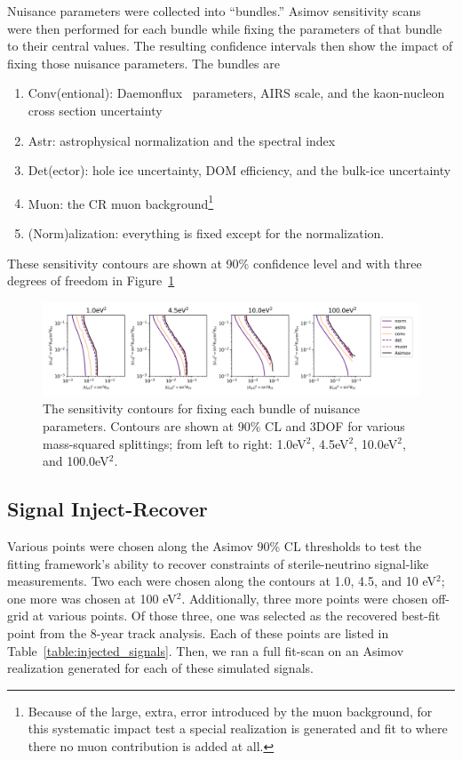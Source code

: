 \documentclass[main.tex]{subfiles}
\begin{document}
Nuisance parameters were collected into ``bundles.'' 
Asimov sensitivity scans~\cite{Cowan_2011} were then performed for each bundle while fixing the parameters of that bundle to their central values.
The resulting confidence intervals then show the impact of fixing those nuisance parameters. 
The bundles are 
\begin{enumerate}
    \item Conv(entional): Daemonflux~\cite{yanez2023daemonflux} parameters, AIRS scale, and the kaon-nucleon cross section uncertainty
    \item Astr: astrophysical normalization and the spectral index
    \item Det(ector): hole ice uncertainty, DOM efficiency, and the bulk-ice uncertainty
    \item Muon: the CR muon background\footnote{Because of the large, extra, error introduced by the muon background, for this systematic impact test a special realization is generated and fit to where there no muon contribution is added at all.}
    \item (Norm)alization: everything is fixed except for the normalization.
\end{enumerate}
These sensitivity contours are shown at 90\% confidence level and with three degrees of freedom in Figure~\ref{fig:impact}

\begin{figure}
    \centering
    \includegraphics[width=0.90\linewidth]{figures/systematic_impact_joint.png}
    \caption{The sensitivity contours for fixing each bundle of nuisance parameters. Contours are shown at 90\% CL and 3DOF for various mass-squared splittings; from left to right: 1.0eV$^{2}$, 4.5eV$^{2}$, 10.0eV$^{2}$, and 100.0eV$^{2}$.}\label{fig:impact}
\end{figure}

\subsection{Signal Inject-Recover}

Various points were chosen along the Asimov 90\% CL thresholds to test the fitting framework's ability to recover constraints of sterile-neutrino signal-like measurements. 
Two each were chosen along the contours at 1.0, 4.5, and 10 eV$^{2}$; one more was chosen at 100 eV$^{2}$. 
Additionally, three more points were chosen off-grid at various points.
Of those three, one was selected as the recovered best-fit point from the 8-year track analysis. 
Each of these points are listed in Table~\ref{table:injected_signals}.
Then, we ran a full fit-scan on an Asimov realization generated for each of these simulated signals. 
\end{document}
